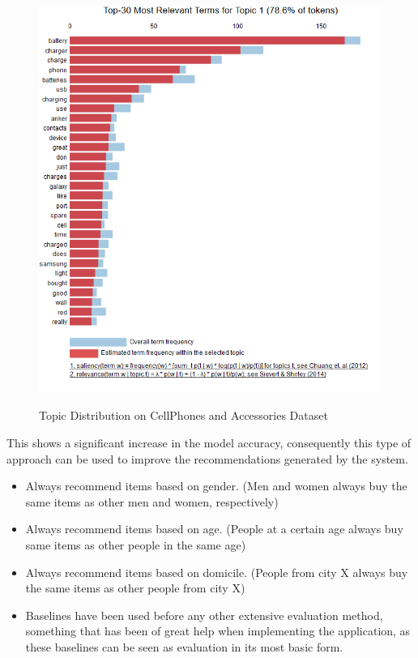 \begin{figure}[H]
  {\includegraphics[width = 0.85 \textwidth]{img/lda/3a.PNG}}
  \caption{Topic Distribution on CellPhones and Accessories Dataset}
\end{figure}


This shows a significant increase in the model accuracy, consequently this type of approach can be used to improve the recommendations generated by the system.

\begin{itemize}
    \item Always recommend items based on gender. (Men and women always buy the same items as other men and women, respectively)
    \item Always recommend items based on age. (People at a certain age always buy same items as other people in the same age)
    \item Always recommend items based on domicile. (People from city X always buy the same items as other people from city X)
    \item Baselines have been used before any other extensive evaluation method, something that has been of great help when implementing the application, as these baselines can be seen as evaluation in its most basic form.
\end{itemize}


